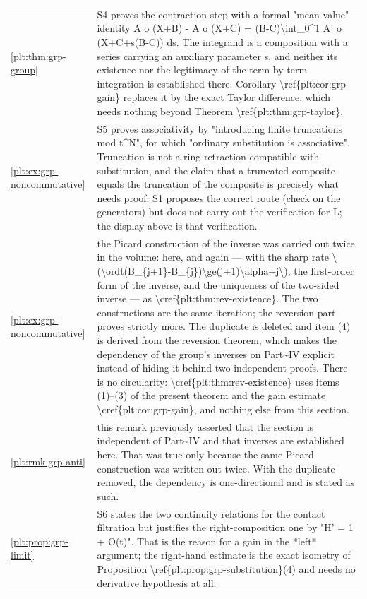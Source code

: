 \documentclass[11pt,oneside]{article}
\theoremstyle{plain}
\theoremstyle{definition}
\theoremstyle{remark}
\begin{document}
\begin{longtable}{@{}p{} p{}@{}}
\cref{plt:thm:grp-group} & S4 proves the contraction step with a formal "mean value" identity A o (X+B) - A o (X+C) = (B-C)\textbackslash int\_0\textasciicircum 1 A' o (X+C+s(B-C)) ds. The integrand is a composition with a series carrying an auxiliary parameter s, and neither its existence nor the legitimacy of the term-by-term integration is established there. Corollary \textbackslash ref\{plt:cor:grp-gain\} replaces it by the exact Taylor difference, which needs nothing beyond Theorem \textbackslash ref\{plt:thm:grp-taylor\}.\\
\cref{plt:ex:grp-noncommutative} & S5 proves associativity by "introducing finite truncations mod t\textasciicircum N", for which "ordinary substitution is associative". Truncation is not a ring retraction compatible with substitution, and the claim that a truncated composite equals the truncation of the composite is precisely what needs proof. S1 proposes the correct route (check on the generators) but does not carry out the verification for L; the display above is that verification.\\
\cref{plt:ex:grp-noncommutative} & the Picard construction of the inverse was carried out twice in the volume: here, and again --- with the sharp rate \textbackslash (\textbackslash ordt(B\_\{j+1\}-B\_\{j\})\textbackslash ge(j+1)\textbackslash alpha+j\textbackslash ), the first-order form of the inverse, and the uniqueness of the two-sided inverse --- as \textbackslash cref\{plt:thm:rev-existence\}. The two constructions are the same iteration; the reversion part proves strictly more. The duplicate is deleted and item (4) is derived from the reversion theorem, which makes the dependency of the group's inverses on Part\textasciitilde IV explicit instead of hiding it behind two independent proofs. There is no circularity: \textbackslash cref\{plt:thm:rev-existence\} uses items (1)--(3) of the present theorem and the gain estimate \textbackslash cref\{plt:cor:grp-gain\}, and nothing else from this section.\\
\cref{plt:rmk:grp-anti} & this remark previously asserted that the section is independent of Part\textasciitilde IV and that inverses are established here. That was true only because the same Picard construction was written out twice. With the duplicate removed, the dependency is one-directional and is stated as such.\\
\cref{plt:prop:grp-limit} & S6 states the two continuity relations for the contact filtration but justifies the right-composition one by "H' = 1 + O(t)". That is the reason for a gain in the *left* argument; the right-hand estimate is the exact isometry of Proposition \textbackslash ref\{plt:prop:grp-substitution\}(4) and needs no derivative hypothesis at all.\\

\end{longtable}
\end{document}
